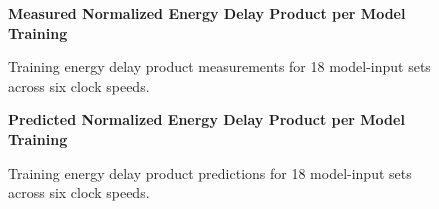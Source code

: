 \begin{figure}[htbp]
    \centering
    \parbox{1.1\textwidth}{\centering\textbf{Measured Normalized Energy Delay Product per Model Training}}
    \caption{Training energy delay product measurements for 18 model-input sets across six clock speeds.}
    \label{fig:grppdpfmtrain}
    \vspace{0.2cm}
    \parbox{1.1\textwidth}{\centering\textbf{Predicted Normalized Energy Delay Product per Model Training}}
    \caption{Training energy delay product predictions for 18 model-input sets across six clock speeds.}
    \label{fig:grppdppredtrain}
\end{figure}

\FloatBarrier


